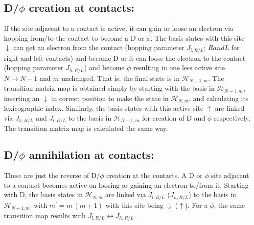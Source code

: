 \documentclass[a4paper]{revtex4-1} %
\newcommand{\da}{\downarrow}
\newcommand{\ua}{\uparrow}
\begin{document}
\subsection{ D/$\phi$ creation at contacts: }
If the site adjacent to a contact is active, 
it can gain or loose an electron via hopping from/to the contact to become a D or $\phi$.
The basis states with this site $\da$ 
can get an electron from the contact (hopping parameter $J_{l,R/L}$; $R and L$ for right and left contacts)
and become D or it can loose the electron to the contact (hopping parameter $J_{h,R/L}$)
and become $\phi$
resulting in one less active site $N\rightarrow N-1$ and $m$ unchanged.
That is, the final state is in $\mathcal{H}_{N-1,m}$. 
The transition matrix map is obtained simply by starting with the basis in $\mathcal{H}_{N-1,m}$,
inserting an $\da$ in correct position to make the state in $\mathcal{H}_{N,m}$,
and calculating its lexicographic index.
Similarly, the basis states with this active site $\ua$ 
are linked via $J_{h,R/L}$ and $J_{l,R/L}$ to 
the basis in $\mathcal{H}_{N-1,m}$
for creation of D and $\phi$ respectively.
The transition matrix map is calculated the same way.


\subsection{ D/$\phi$ annihilation at contacts: }
These are just the reverse of D/$\phi$ creation at the contacts.
A D or $\phi$ site adjacent to a contact becomes active on loosing or gaining an electron to/from it.
Starting with D, 
the basis states in $\mathcal{H}_{N,m}$
are linked via $J_{l,R/L}$ ($J_{h,R/L}$) to 
the basis in $\mathcal{H}_{N+1,m^\prime}$ with $m^\prime=m\,(m+1)$
with this site being $\da$ ($\ua$).
For a $\phi$, 
the same transition map results with $J_{l,R/L} \leftrightarrow J_{h,R/L} $.





\end{document}
